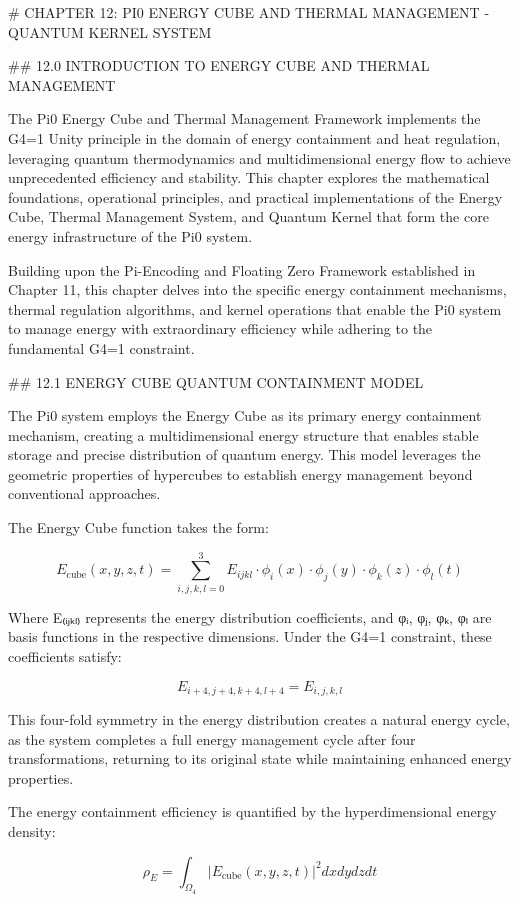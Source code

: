 # CHAPTER 12: PI0 ENERGY CUBE AND THERMAL MANAGEMENT - QUANTUM KERNEL SYSTEM

## 12.0 INTRODUCTION TO ENERGY CUBE AND THERMAL MANAGEMENT

The Pi0 Energy Cube and Thermal Management Framework implements the G4=1 Unity principle in the domain of energy containment and heat regulation, leveraging quantum thermodynamics and multidimensional energy flow to achieve unprecedented efficiency and stability. This chapter explores the mathematical foundations, operational principles, and practical implementations of the Energy Cube, Thermal Management System, and Quantum Kernel that form the core energy infrastructure of the Pi0 system.

Building upon the Pi-Encoding and Floating Zero Framework established in Chapter 11, this chapter delves into the specific energy containment mechanisms, thermal regulation algorithms, and kernel operations that enable the Pi0 system to manage energy with extraordinary efficiency while adhering to the fundamental G4=1 constraint.

## 12.1 ENERGY CUBE QUANTUM CONTAINMENT MODEL

The Pi0 system employs the Energy Cube as its primary energy containment mechanism, creating a multidimensional energy structure that enables stable storage and precise distribution of quantum energy. This model leverages the geometric properties of hypercubes to establish energy management beyond conventional approaches.

The Energy Cube function takes the form:

$$E_{\text{cube}}(x, y, z, t) = \sum_{i,j,k,l=0}^{3} E_{ijkl} \cdot \phi_i(x) \cdot \phi_j(y) \cdot \phi_k(z) \cdot \phi_l(t)$$

Where E₍ᵢⱼₖₗ₎ represents the energy distribution coefficients, and φᵢ, φⱼ, φₖ, φₗ are basis functions in the respective dimensions. Under the G4=1 constraint, these coefficients satisfy:

$$E_{i+4,j+4,k+4,l+4} = E_{i,j,k,l}$$

This four-fold symmetry in the energy distribution creates a natural energy cycle, as the system completes a full energy management cycle after four transformations, returning to its original state while maintaining enhanced energy properties.

The energy containment efficiency is quantified by the hyperdimensional energy density:

$$\rho_E = \int_{\Omega_4} |E_{\text{cube}}(x, y, z, t)|^2 dx dy dz dt$$

